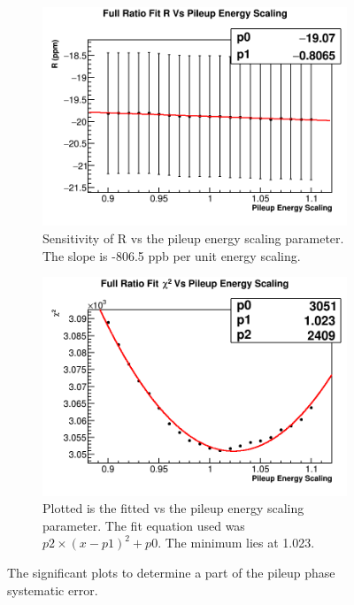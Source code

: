 		\begin{figure}[]
		\centering
		    \begin{subfigure}[t]{0.45\textwidth}
			    \centering
				\includegraphics[width=\textwidth]{RatioCBO_R_Vs_PileupEnergyScaling_Canv}
			    \caption{Sensitivity of R vs the pileup energy scaling parameter. The slope is -806.5 ppb per unit energy scaling.}
		    \end{subfigure}
		    \hspace{4mm}
		    \begin{subfigure}[t]{0.45\textwidth}
			    \centering
				\includegraphics[width=\textwidth]{RatioCBO_Chi2_Vs_PileupEnergyScaling_Canv}
			    \caption{Plotted is the fitted \chisq vs the pileup energy scaling parameter. The fit equation used was $p2 \times (x - p1)^{2} + p0.$ The minimum lies at 1.023.}
		    \end{subfigure}
		\caption[PileupEnergyScaling]{The significant plots to determine a part of the pileup phase systematic error.}
		\label{fig:PileupEnergyScaling}
		\end{figure}


